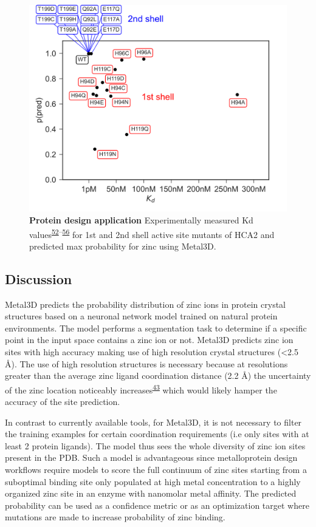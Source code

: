 \documentclass[  ASAPversion,
  ,
  9pt]{elife}
\begin{document}
\begin{figure}
\hypertarget{fig:hca-kd}{%
\centering
\includegraphics{images/kd_vs_p_nolog_newmethod_newmodel_0.5.png}
\caption{\textbf{Protein design application} Experimentally measured Kd values\textsuperscript{\protect\hyperlink{ref-D3VQQdjb}{52}--\protect\hyperlink{ref-TNbPH3Y1}{56}} for 1st and 2nd shell active site mutants of HCA2 and predicted max probability for zinc using Metal3D.}\label{fig:hca-kd}
}
\end{figure}

\hypertarget{discussion}{%
\subsection{Discussion}\label{discussion}}

Metal3D predicts the probability distribution of zinc ions in protein crystal structures based on a neuronal network model trained on natural protein environments. The model performs a segmentation task to determine if a specific point in the input space contains a zinc ion or not. Metal3D predicts zinc ion sites with high accuracy making use of high resolution crystal structures (\textless2.5 \AA ). The use of high resolution structures is necessary because at resolutions greater than the average zinc ligand coordination distance (2.2 \AA ) the uncertainty of the zinc location noticeably increases\textsuperscript{\protect\hyperlink{ref-Wt0ducot}{43}} which would likely hamper the accuracy of the site prediction.

In contrast to currently available tools, for Metal3D, it is not necessary to filter the training examples for certain coordination requirements (i.e only sites with at least 2 protein ligands). The model thus sees the whole diversity of zinc ion sites present in the PDB. Such a model is advantageous since metalloprotein design workflows require models to score the full continuum of zinc sites starting from a suboptimal binding site only populated at high metal concentration to a highly organized zinc site in an enzyme with nanomolar metal affinity. The predicted probability can be used as a confidence metric or as an optimization target where mutations are made to increase probability of zinc binding.
\end{document}
